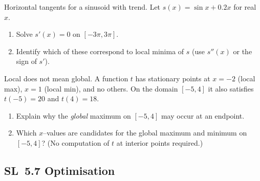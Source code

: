 \documentclass[11pt]{article}
\def\textbf#1{#1}%
\newcommand{\tocsubsection}[1]{\subsection{#1}}
\newcounter{question}
\begin{document}
\begin{question}
\textbf{Horizontal tangents for a sinusoid with trend.}
Let $s(x)=\sin x+0.2x$ for real $x$.
\begin{enumerate}
  \item Solve $s'(x)=0$ on $[-3\pi,3\pi]$.
  \item Identify which of these correspond to local minima of $s$ (use $s''(x)$ or the sign of $s'$).
\end{enumerate}
\end{question}

\begin{question}
\textbf{Local does not mean global.}
A function $t$ has stationary points at $x=-2$ (local max), $x=1$ (local min), and no others. On the domain $[-5,4]$ it also satisfies $t(-5)=20$ and $t(4)=18$.
\begin{enumerate}
  \item Explain why the \emph{global} maximum on $[-5,4]$ may occur at an endpoint.
  \item Which $x$–values are candidates for the global maximum and minimum on $[-5,4]$? (No computation of $t$ at interior points required.)
\end{enumerate}
\end{question}


\tocsubsection{SL 5.7 \; Optimisation}

\end{document}
